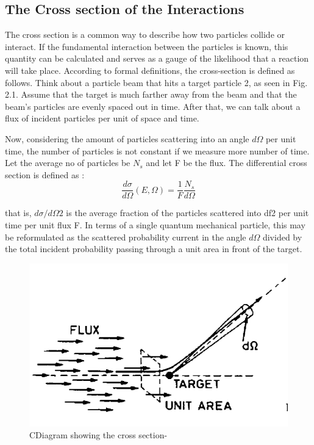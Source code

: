 \documentclass{article}
\begin{document}
\begin{multicols}{2}
\subsection{The Cross section of the Interactions}

The cross section is a common way to describe how two particles 
collide or interact. If the fundamental interaction between the 
particles is known, this quantity can be calculated and serves as a 
gauge of the likelihood that a reaction will take place. According 
to formal definitions, the cross-section is defined as follows. 
Think about a particle beam that hits a target particle 2, as 
seen in Fig. 2.1. Assume that the target is much farther away 
from the beam and that the beam's particles are evenly spaced out 
in time. After that, we can talk about a flux of incident particles 
per unit of space and time. 

Now, considering the amount of particles scattering into an angle 
$d\Omega$ per unit time, the number of particles is not constant if we 
measure more number of time. Let the average no of particles be $N_s$ and let F
be the flux. The differential cross section is defined as :
\begin{equation}
    \frac{d\sigma}{d\Omega} (E,\Omega) = \frac{1}{F}  \frac{N_s}{d\Omega}
\end{equation}

that is, $d\sigma/d\Omega2$ is the average fraction of the particles scattered into df2 per unit time per
unit flux F. In terms of a single quantum mechanical particle, this may be reformulated
as the scattered probability current in the angle $d\Omega$ divided by the total incident
probability passing through a unit area in front of the target.


\begin{figure}[H]
    \centering	
     \includegraphics[width=\columnwidth]{crossection.png}
     \caption{CDiagram showing the cross section-\cite{leo1988techniques}}
     \label{CSdiag}
\end{figure}


\end{multicols}
\end{document}
